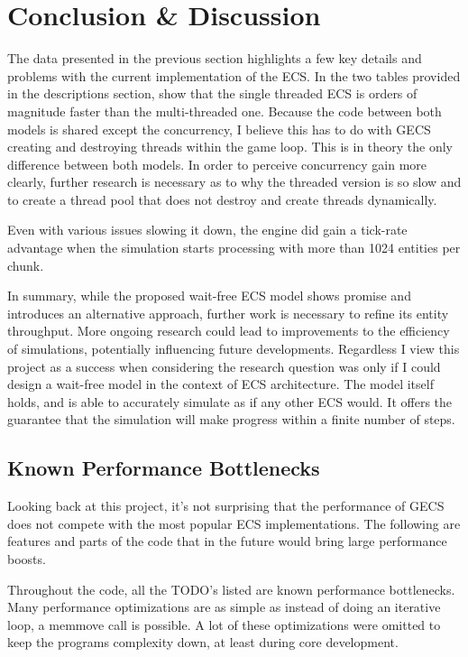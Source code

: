 \section{Conclusion \& Discussion}
The data presented in the previous section highlights a few key details and problems with the current implementation of the ECS. In the two tables provided in the descriptions section, show that the single threaded ECS is orders of magnitude faster than the multi-threaded one. Because the code between both models is shared except the concurrency, I believe this has to do with GECS creating and destroying threads within the game loop. This is in theory the only difference between both models. In order to perceive concurrency gain more clearly, further research is necessary as to why the threaded version is so slow and to create a thread pool that does not destroy and create threads dynamically. 

Even with various issues slowing it down, the engine did gain a tick-rate advantage when the simulation starts processing with more than 1024 entities per chunk. 

In summary, while the proposed wait-free ECS model shows promise and introduces an alternative approach, further work is necessary to refine its entity throughput. More ongoing research could lead to improvements to the efficiency of simulations, potentially influencing future developments. Regardless I view this project as a success when considering the research question was only if I could design a wait-free model in the context of ECS architecture. The model itself holds, and is able to accurately simulate as if any other ECS would. It offers the guarantee that the simulation will make progress within a finite number of steps.

\subsection{Known Performance Bottlenecks}
Looking back at this project, it's not surprising that the performance of GECS does not compete with the most popular ECS implementations. The following are features and parts of the code that in the future would bring large performance boosts. 

Throughout the code, all the TODO's listed are known performance bottlenecks. Many performance optimizations are as simple as instead of doing an iterative loop, a memmove call is possible. A lot of these optimizations were omitted to keep the programs complexity down, at least during core development.

